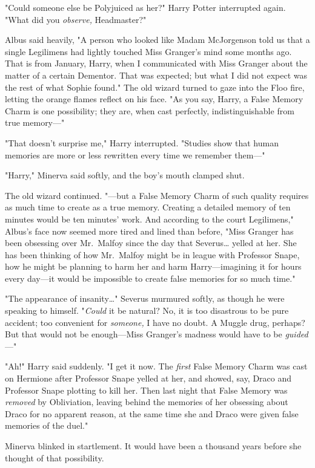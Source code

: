 "Could someone else be Polyjuiced as her?" Harry Potter interrupted again. 
"What did you \emph{observe,} Headmaster?"

Albus said heavily, "A person who looked like Madam McJorgenson told us that a 
single Legilimens had lightly touched Miss Granger's mind some months ago. That 
is from January, Harry, when I communicated with Miss Granger about the matter 
of a certain Dementor. That was expected; but what I did not expect was the 
rest of what Sophie found." The old wizard turned to gaze into the Floo fire, 
letting the orange flames reflect on his face. "As you say, Harry, a False 
Memory Charm is one possibility; they are, when cast perfectly, 
indistinguishable from true memory---"

"That doesn't surprise me," Harry interrupted. "Studies show that human 
memories are more or less rewritten every time we remember them---"

"Harry," Minerva said softly, and the boy's mouth clamped shut.

The old wizard continued. "---but a False Memory Charm of such quality requires 
as much time to create as a true memory. Creating a detailed memory of ten 
minutes would be ten minutes' work. And according to the court Legilimens," 
Albus's face now seemed more tired and lined than before, "Miss Granger has 
been obsessing over Mr.~Malfoy since the day that Severus{\ldots} yelled at 
her. She has been thinking of how Mr.~Malfoy might be in league with Professor 
Snape, how he might be planning to harm her and harm Harry---imagining it for 
hours every day---it would be impossible to create false memories for so much 
time."

"The appearance of insanity{\ldots}" Severus murmured softly, as though he were 
speaking to himself. "\emph{Could} it be natural? No, it is too disastrous to 
be pure accident; too convenient for \emph{someone,} I have no doubt. A Muggle 
drug, perhaps? But that would not be enough---Miss Granger's madness would have 
to be \emph{guided}---"

"Ah!" Harry said suddenly. "I get it now. The \emph{first} False Memory Charm 
was cast on Hermione after Professor Snape yelled at her, and showed, say, 
Draco and Professor Snape plotting to kill her. Then last night that False 
Memory was \emph{removed} by Obliviation, leaving behind the memories of her 
obsessing about Draco for no apparent reason, at the same time she and Draco 
were given false memories of the duel."

Minerva blinked in startlement. It would have been a thousand years before she 
thought of that possibility.

